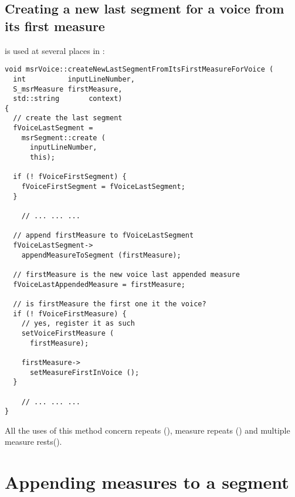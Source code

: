 \subsection{Creating a new last segment for a voice from its first measure}

 is used at several places in :
\begin{lstlisting}[language=CPlusPlus]
void msrVoice::createNewLastSegmentFromItsFirstMeasureForVoice (
  int          inputLineNumber,
  S_msrMeasure firstMeasure,
  std::string       context)
{
  // create the last segment
  fVoiceLastSegment =
    msrSegment::create (
      inputLineNumber,
      this);

  if (! fVoiceFirstSegment) {
    fVoiceFirstSegment = fVoiceLastSegment;
  }

	// ... ... ...

  // append firstMeasure to fVoiceLastSegment
  fVoiceLastSegment->
    appendMeasureToSegment (firstMeasure);

  // firstMeasure is the new voice last appended measure
  fVoiceLastAppendedMeasure = firstMeasure;

  // is firstMeasure the first one it the voice?
  if (! fVoiceFirstMeasure) {
    // yes, register it as such
    setVoiceFirstMeasure (
      firstMeasure);

    firstMeasure->
      setMeasureFirstInVoice ();
  }

	// ... ... ...
}
\end{lstlisting}

All the uses of this method concern repeats (), measure repeats () and multiple measure rests().


\section{Appending measures to a segment}

